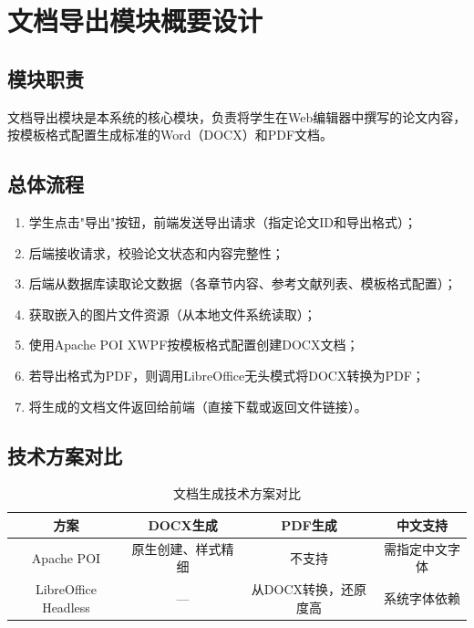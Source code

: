 \section{文档导出模块概要设计}

\subsection{模块职责}

文档导出模块是本系统的核心模块，负责将学生在Web编辑器中撰写的论文内容，按模板格式配置生成标准的Word（DOCX）和PDF文档。

\subsection{总体流程}

\begin{enumerate}
    \item 学生点击"导出"按钮，前端发送导出请求（指定论文ID和导出格式）；
    \item 后端接收请求，校验论文状态和内容完整性；
    \item 后端从数据库读取论文数据（各章节内容、参考文献列表、模板格式配置）；
    \item 获取嵌入的图片文件资源（从本地文件系统读取）；
    \item 使用Apache POI XWPF按模板格式配置创建DOCX文档；
    \item 若导出格式为PDF，则调用LibreOffice无头模式将DOCX转换为PDF；
    \item 将生成的文档文件返回给前端（直接下载或返回文件链接）。
\end{enumerate}

\subsection{技术方案对比}

\begin{table}[htbp]
\centering
\caption{文档生成技术方案对比}
\label{tab:export_compare}
\begin{tabular}{|c|c|c|c|}
\hline
\textbf{方案} & \textbf{DOCX生成} & \textbf{PDF生成} & \textbf{中文支持} \\
\hline
Apache POI & 原生创建、样式精细 & 不支持 & 需指定中文字体 \\
\hline
LibreOffice Headless & — & 从DOCX转换，还原度高 & 系统字体依赖 \\
\hline
\end{tabular}
\end{table}

